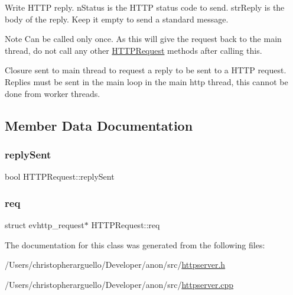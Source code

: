 Write H\+T\+TP reply. n\+Status is the H\+T\+TP status code to send. str\+Reply is the body of the reply. Keep it empty to send a standard message.

\begin{DoxyNote}{Note}
Can be called only once. As this will give the request back to the main thread, do not call any other \mbox{\hyperlink{class_h_t_t_p_request}{H\+T\+T\+P\+Request}} methods after calling this.
\end{DoxyNote}
Closure sent to main thread to request a reply to be sent to a H\+T\+TP request. Replies must be sent in the main loop in the main http thread, this cannot be done from worker threads. 

\subsection{Member Data Documentation}
\mbox{\label{class_h_t_t_p_request_a1267b5e169b279bdbce5ea9c90f04483}} 
\subsubsection{\texorpdfstring{reply\+Sent}{replySent}}
{\footnotesize\ttfamily bool H\+T\+T\+P\+Request\+::reply\+Sent\hspace{0.3cm}{\ttfamily [private]}}

\mbox{\label{class_h_t_t_p_request_aa8b4243a4a15afaa00b3b47947fcfea3}} 
\subsubsection{\texorpdfstring{req}{req}}
{\footnotesize\ttfamily struct evhttp\+\_\+request$\ast$ H\+T\+T\+P\+Request\+::req\hspace{0.3cm}{\ttfamily [private]}}



The documentation for this class was generated from the following files\+:\begin{DoxyCompactItemize}
\item 
/\+Users/christopherarguello/\+Developer/anon/src/\mbox{\hyperlink{httpserver_8h}{httpserver.\+h}}\item 
/\+Users/christopherarguello/\+Developer/anon/src/\mbox{\hyperlink{httpserver_8cpp}{httpserver.\+cpp}}\end{DoxyCompactItemize}
